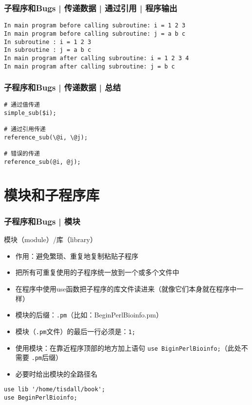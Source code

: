 \begin{frame}[fragile]
  \frametitle{子程序和Bugs | 传递数据 | 通过引用 | 程序输出}
\begin{lstlisting}
In main program before calling subroutine: i = 1 2 3
In main program before calling subroutine: j = a b c
In subroutine : i = 1 2 3
In subroutine : j = a b c
In main program after calling subroutine: i = 1 2 3 4
In main program after calling subroutine: j = b c
\end{lstlisting}
\end{frame}

\begin{frame}[fragile]
  \frametitle{子程序和Bugs | 传递数据 | \alert{总结}}
\begin{lstlisting}
# 通过值传递
simple_sub($i);

# 通过引用传递
reference_sub(\@i, \@j);

# 错误的传递
reference_sub(@i, @j);
\end{lstlisting}
\end{frame}

\section{模块和子程序库}
\begin{frame}[fragile]
  \frametitle{子程序和Bugs | \alert{模块}}
  \begin{block}{模块（module）/库（library）}
    \begin{itemize}
      \item 作用：避免繁琐、重复地复制粘贴子程序
      \item 把所有可重复使用的子程序统一放到一个或多个文件中
      \item 在程序中使用use函数把子程序的库文件读进来（就像它们本身就在程序中一样）
      \item 模块的后缀：\verb|.pm|（比如：BeginPerlBioinfo.pm）
      \item 模块（\verb|.pm|文件）的最后一行必须是：\verb|1;|
      \item 使用模块：在靠近程序顶部的地方加上语句 \verb|use BiginPerlBioinfo;|（此处不需要 \verb|.pm|后缀）
      \item 必要时给出模块的全路径名
    \end{itemize}
  \end{block}
\begin{lstlisting}
use lib '/home/tisdall/book';
use BeginPerlBioinfo;
\end{lstlisting}
\end{frame}


